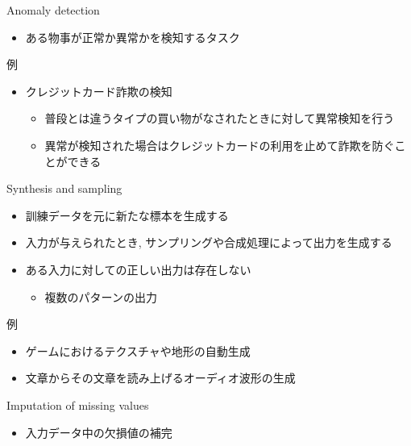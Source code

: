 \documentclass[dvipdfmx, 10pt]{beamer}
\newcommand{\green}[1]{\textcolor{green!40!black}{#1}}
\begin{document}

\begin{frame}{Anomaly detection}
  \begin{itemize}
    \item ある物事が正常か異常かを検知するタスク
  \end{itemize}
  \begin{exampleblock}{例}
    \begin{itemize}
      \item クレジットカード詐欺の検知
      \begin{itemize}
        \item 普段とは違うタイプの買い物がなされたときに対して異常検知を行う
        \item 異常が検知された場合はクレジットカードの利用を止めて詐欺を防ぐことができる
      \end{itemize}
    \end{itemize}
  \end{exampleblock}
\end{frame}


\begin{frame}{Synthesis and sampling}
  \begin{itemize}
    \item 訓練データを元に新たな標本を生成する
    \item 入力が与えられたとき, サンプリングや合成処理によって出力を生成する
    \item ある入力に対しての正しい出力は存在しない
    \begin{itemize}
      \item 複数のパターンの出力
    \end{itemize}
  \end{itemize}
  \begin{exampleblock}{例}
    \begin{itemize}
      \item ゲームにおけるテクスチャや地形の自動生成
      \item 文章からその文章を読み上げるオーディオ波形の生成
    \end{itemize}
  \end{exampleblock}
\end{frame}


\begin{frame}{Imputation of missing values}
  \begin{itemize}
    \item 入力データ中の欠損値の補完
  \end{itemize}
\end{frame}
\end{document}
